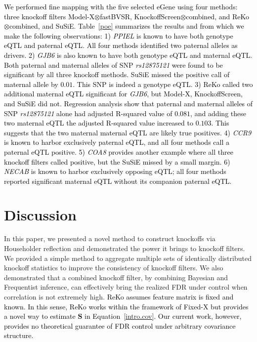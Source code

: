 \documentclass[12pt,Times]{article}
\def\tcb{\textcolor{black}}
\def\S{{\mathbf{S}}}
\begin{document}
\tcb{
We performed fine mapping with the five selected eGene using four methods: three knockoff filters Model-X\allowbreak$\otimes$fastBVSR,  KnockoffScreen\allowbreak$\otimes$combined, and ReKo\allowbreak$\otimes$combined, and SuSiE. 
Table~\ref{poe} summarizes the results and from which we make the following observations: 
1) \emph{PPIEL} is known to have both genotype eQTL and  paternal eQTL. All four methods identified two paternal alleles as drivers.  
2) \emph{GJB6} is also known to have both genotype eQTL and maternal eQTL. Both paternal and maternal alleles of SNP \emph{rs12875121} were found to be significant by all three knockoff methods. SuSiE missed the positive call of maternal allele by $0.01$.  This SNP is indeed a genotype eQTL.  
3) ReKo called two additional maternal eQTL significant for \emph{GJB6},   but Model-X, KnockoffScreen, and SuSiE did not. Regression analysis show that paternal and maternal alleles of SNP \emph{rs12875121} alone had adjusted R-squared value of $0.081$, and adding these two maternal eQTL the adjusted R-squared value increased to $0.103$. This suggests that the two maternal maternal eQTL are likely true positives.  
4) \emph{CCR9} is known to harbor exclusively paternal eQTL, and all four methods call a paternal eQTL positive.  
5) \emph{COA8}  provides another example where all three knockoff filters called positive, but the SuSiE missed by a small margin. 
6) \emph{NECAB}  is known to harbor exclusively opposing eQTL; all four methods reported significant maternal eQTL without its companion paternal eQTL.   
}

\section{Discussion}

In this paper, we presented a novel method to construct knockoffs via Householder reflection and demonstrated the power it brings to knockoff filters. We provided a simple method to aggregate multiple sets of identically distributed
knockoff statistics to improve the consistency of knockoff filters.  
We also demonstrated that a combined knockoff filter, by combining Bayesian and Frequentist inference, can effectively bring the realized FDR under control when correlation is not extremely high. 
\tcb{ReKo assumes feature matrix is fixed and known. In this sense, ReKo works within the framework of Fixed-X but provides a novel way to estimate $\S$ in Equation~\ref{intro.cov}. Our current work, however, provides no theoretical guarantee of FDR control under arbitrary covariance structure.} 
\end{document}
